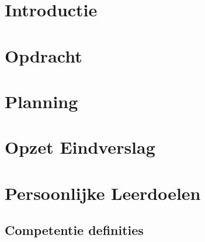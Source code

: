 \documentclass[]{report}
\begin{document}
\tableofcontents
\newpage

\chapter{Introductie}
\label{introduction}


\chapter{Opdracht}
\label{ch:opdracht}


\chapter{Planning}
\label{ch:planning}


\chapter{Opzet Eindverslag}
\label{ch:eindverslag}


\chapter{Persoonlijke Leerdoelen}
\label{ch:leerdoelen}

\begin{appendix}
\chapter{Competentie definities}
\label{app:competenties}


\end{appendix}
\end{document}
